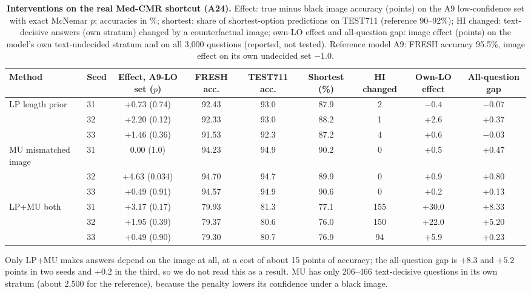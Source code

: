 \begin{table}[t]
  \centering
  \footnotesize
  \setlength{\tabcolsep}{4pt}
  \begin{tabular}{@{}llccccccc@{}}
    \toprule
    Method & Seed & Effect, A9-LO set ($p$) & FRESH acc. & TEST711 acc. & Shortest (\%) & HI changed & Own-LO effect & All-question gap \\
    \midrule
    LP length prior & 31 & +0.73 (0.74) & 92.43 & 93.0 & 87.9 & 2 & $-0.4$ & $-0.07$ \\
     & 32 & +2.20 (0.12) & 92.33 & 93.0 & 88.2 & 1 & +2.6 & +0.37 \\
     & 33 & +1.46 (0.36) & 91.53 & 92.3 & 87.2 & 4 & +0.6 & $-0.03$ \\
    MU mismatched image & 31 & 0.00 (1.0) & 94.23 & 94.9 & 90.2 & 0 & +0.5 & +0.47 \\
     & 32 & +4.63 (0.034) & 94.70 & 94.7 & 89.9 & 0 & +0.9 & +0.80 \\
     & 33 & +0.49 (0.91) & 94.57 & 94.9 & 90.6 & 0 & +0.2 & +0.13 \\
    LP+MU both & 31 & +3.17 (0.17) & 79.93 & 81.3 & 77.1 & 155 & +30.0 & +8.33 \\
     & 32 & +1.95 (0.39) & 79.37 & 80.6 & 76.0 & 150 & +22.0 & +5.20 \\
     & 33 & +0.49 (0.90) & 79.30 & 80.7 & 76.9 & 94 & +5.9 & +0.23 \\
    \bottomrule
  \end{tabular}
  \caption{\textbf{Interventions on the real Med-CMR shortcut (A24).} Effect: true minus black image accuracy (points) on the A9 low-confidence set with exact McNemar $p$; accuracies in \%; shortest: share of shortest-option predictions on TEST711 (reference 90--92\%); HI changed: text-decisive answers (own stratum) changed by a counterfactual image; own-LO effect and all-question gap: image effect (points) on the model's own text-undecided stratum and on all 3{,}000 questions (reported, not tested). Reference model A9: FRESH accuracy 95.5\%, image effect on its own undecided set $-1.0$.}
  \label{tab:a24}
\end{table}

Only LP+MU makes answers depend on the image at all, at a cost of about 15 points of accuracy; the all-question gap is $+8.3$ and $+5.2$ points in two seeds and $+0.2$ in the third, so we do not read this as a result.
MU has only 206--466 text-decisive questions in its own stratum (about 2{,}500 for the reference), because the penalty lowers its confidence under a black image.

